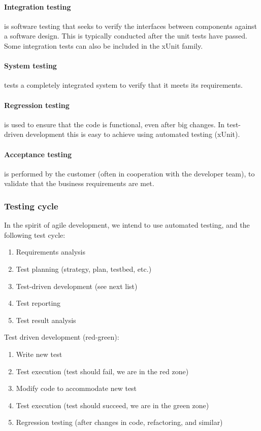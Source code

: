 \paragraph{Integration testing} is software testing that seeks to verify the interfaces
between components against a software design. This is typically conducted after
the unit tests have passed. Some integration tests can also be included in the
xUnit family.

\paragraph{System testing} tests a completely integrated system to verify that it meets its
requirements.

\paragraph{Regression testing} is used to ensure that the code is functional, even after big
changes. In test-driven development this is easy to achieve using automated
testing (xUnit).

\paragraph{Acceptance testing} is performed by the customer (often in cooperation with the
developer team), to validate that the business requirements are met.

\subsubsection{Testing cycle}

In the spirit of agile development, we intend to use automated testing, and the
following test cycle:

\begin{enumerate}
	\item Requirements analysis
	\item Test planning (strategy, plan, testbed, etc.)
	\item Test-driven development (see next list)
	\item Test reporting
	\item Test result analysis
\end{enumerate}

Test driven development (red-green):
\begin{enumerate}
	\item Write new test
	\item Test execution (test should fail, we are in the red zone)
	\item Modify code to accommodate new test
	\item Test execution (test should succeed, we are in the green zone)
	\item Regression testing (after changes in code, refactoring, and similar)
\end{enumerate}

